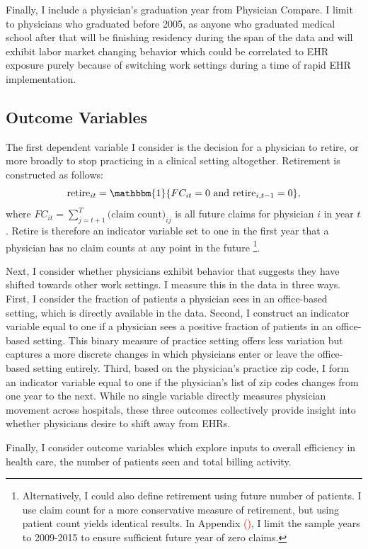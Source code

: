 \documentclass[11pt]{article}
\begin{document}
Finally, I include a physician's graduation year from Physician Compare. I limit to physicians who graduated before 2005, as anyone who graduated medical school after that will be finishing residency during the span of the data and will exhibit labor market changing behavior which could be correlated to EHR exposure purely because of switching work settings during a time of rapid EHR implementation.

\subsection{Outcome Variables}\label{sec:outcome}

The first dependent variable I consider is the decision for a physician to retire, or more broadly to stop practicing in a clinical setting altogether. Retirement is constructed as follows: 
$$\text{retire}_{it}=\mathbbm{1}\{FC_{it}=0 \text{ and retire}_{i,t-1}=0\}, $$
where $FC_{it}=\sum\limits_{j=t+1}^T\text{(claim count)}_{ij}$ is all future claims for physician $i$ in year $t$. Retire is therefore an indicator variable set to one in the first year that a physician has no claim counts at any point in the future \footnote{Alternatively, I could also define retirement using future number of patients. I use claim count for a more conservative measure of retirement, but using patient count yields identical results. In Appendix \textcolor{red}{()}, I limit the sample years to 2009-2015 to ensure sufficient future year of zero claims.}.

Next, I consider whether physicians exhibit behavior that suggests they have shifted towards other work settings. I measure this in the data in three ways. First, I consider the fraction of patients a physician sees in an office-based setting, which is directly available in the data. Second, I construct an indicator variable equal to one if a physician sees a positive fraction of patients in an office-based setting. This binary measure of practice setting offers less variation but captures a more discrete changes in which physicians enter or leave the office-based setting entirely. Third, based on the physician's practice zip code, I form an indicator variable equal to one if the physician's list of zip codes changes from one year to the next. While no single variable directly measures physician movement across hospitals, these three outcomes collectively provide insight into whether physicians desire to shift away from EHRs.

Finally, I consider outcome variables which explore inputs to overall efficiency in health care, the number of patients seen and total billing activity.
\end{document}
